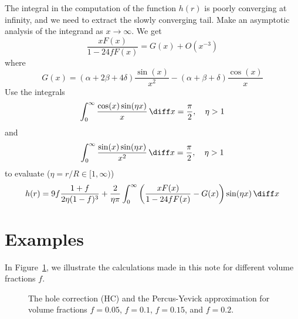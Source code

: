 \documentclass[12pt,a4paper]{article}
\begin{document}
The integral in the computation of the function $h(r)$ is poorly converging at infinity, and we need to extract the slowly converging tail.
Make an asymptotic analysis of the integrand as $x\to\infty$.
We get
\begin{equation*}
\frac{xF(x)}{1-24fF(x)}
=G(x)+O(x^{-3})
\end{equation*}
where
\begin{equation}\label{eq:P-Y 3}
G(x)=\left(\alpha+2\beta+4\delta\right)\frac{\sin(x)}{x^2}-\left(\alpha+\beta+\delta\right)\frac{\cos(x)}{x}
\end{equation}
Use the integrals~\cite{Gradshteyn+Ryzhik2007}
\begin{equation*}
 \int_{0}^{\infty}\frac{\cos(x)\sin(\eta x)}{x}\,\diff x=\frac{\pi}{2},\quad \eta>1
\end{equation*}
and
\begin{equation*}
 \int_{0}^{\infty}\frac{\sin(x)\sin(\eta x)}{x^2}\,\diff x=\frac{\pi}{2},\quad \eta>1
\end{equation*}
to evaluate ($\eta=r/R\in[1,\infty)$)
\begin{equation*}
 h(r)=9f\frac{1+f}{2\eta(1-f)^3}%
 +\frac{2}{\eta\pi}\int_{0}^{\infty}\left(\frac{xF(x)}{1-24fF(x)}-G(x)\right)\sin(\eta x)\,\diff x
\end{equation*}

\section{Examples}

In Figure~\ref{fig:P-Y}, we illustrate the calculations made in this note for different volume fractions $f$.

\begin{figure}[t]
\begin{center}
\end{center}
    \caption{The hole correction (HC) and the Percus-Yevick approximation for volume fractions $f=0.05$,  $f=0.1$, $f=0.15$, and $f=0.2$.}
\label{fig:P-Y}
\end{figure}

\end{document}
